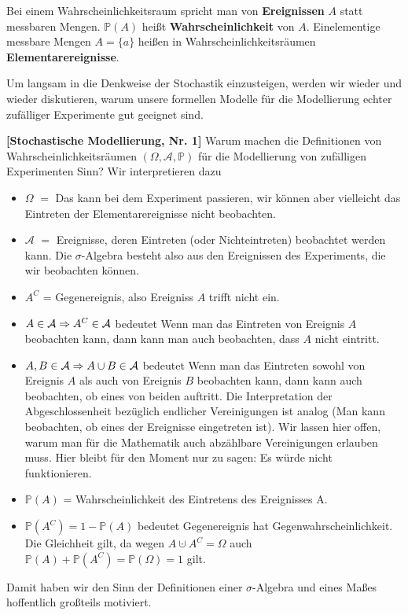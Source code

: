 \begin{bem} 
	Bei einem Wahrscheinlichkeitsraum spricht man von \textbf{Ereignissen} $A$ statt messbaren Mengen. $\mathbb P(A)$ heißt \textbf{Wahrscheinlichkeit} von $A$. Einelementige messbare Mengen $A = \{a\}$ heißen in Wahrscheinlichkeitsräumen \textbf{Elementarereignisse}.
\end{bem}

Um langsam in die Denkweise der Stochastik einzusteigen, werden wir wieder und wieder diskutieren, warum unsere formellen Modelle f\"ur die Modellierung echter zuf\"alliger Experimente gut geeignet sind. 

\begin{disc} \label{N1} \textbf{[Stochastische Modellierung, Nr. 1]}
	Warum machen die Definitionen von Wahrscheinlichkeitsräumen $(\Omega, \mathcal A, \mathbb P)$ für die Modellierung von zufälligen Experimenten Sinn? Wir interpretieren dazu
	\begin{itemize}
		\item $\Omega$ $=$ \glqq Das kann bei dem Experiment passieren\grqq, wir k\"onnen aber vielleicht das Eintreten der Elementarereignisse nicht beobachten.
		\item $\mathcal A$ $=$ \glqq Ereignisse, deren Eintreten (oder Nichteintreten) beobachtet werden kann.\grqq{} Die $\sigma$-Algebra besteht also aus den Ereignissen des Experiments, die wir beobachten k\"onnen.
		\item $A^C$ = \glqq Gegenereignis\grqq, also \glqq Ereigniss $A$ trifft nicht ein\grqq.
		\item $A \in \mathcal{A} \Rightarrow A^{C} \in \mathcal{A}$ bedeutet \glqq Wenn man das Eintreten von Ereignis $A$ beobachten kann, dann kann man auch beobachten, dass $A$ nicht eintritt.\grqq		
		\item $A, B\in \mathcal{A} \Rightarrow A\cup B\in \mathcal{A}$ bedeutet \glqq Wenn man das Eintreten  sowohl von Ereignis $A$ als auch von Ereignis $B$ beobachten kann, dann kann auch beobachten, ob eines von beiden auftritt.\grqq{} Die Interpretation der Abgeschlossenheit bez\"uglich endlicher Vereinigungen ist analog (\glqq Man kann beobachten, ob eines der Ereignisse eingetreten ist\grqq). Wir lassen hier offen, warum man f\"ur die Mathematik auch abz\"ahlbare Vereinigungen erlauben muss. Hier bleibt f\"ur den Moment nur zu sagen: Es w\"urde nicht funktionieren.
				\item $\mathbb P(A)$ = \glqq Wahrscheinlichkeit des Eintretens des Ereignisses A.\grqq
		\item $\mathbb P(A^C) = 1-\mathbb P(A)$ bedeutet \glqq Gegenereignis hat Gegenwahrscheinlichkeit.\grqq{} Die Gleichheit gilt, da wegen $A\cupdot A^C=\Omega$ auch $\mathbb P(A)+\mathbb P(A^C)=\mathbb P(\Omega)=1$ gilt.
	\end{itemize}
Damit haben wir den Sinn der Definitionen einer $\sigma$-Algebra und eines Ma\ss es hoffentlich gro\ss teils motiviert.\smallskip


\end{disc}
